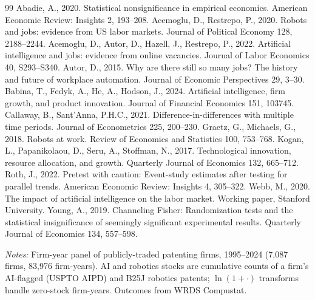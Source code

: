 \documentclass[12pt]{article}
\begin{document}
\begin{thebibliography}{99}
 Abadie, A., 2020. Statistical nonsignificance in empirical
economics. American Economic Review: Insights 2, 193--208.
 Acemoglu, D., Restrepo, P., 2020. Robots and
jobs: evidence from US labor markets. Journal of Political Economy 128, 2188--2244.
 Acemoglu, D., Autor, D., Hazell, J., Restrepo, P.,
2022. Artificial intelligence and jobs: evidence from online vacancies. Journal of Labor
Economics 40, S293--S340.
 Autor, D., 2015. Why are there still so many jobs? The history
and future of workplace automation. Journal of Economic Perspectives 29, 3--30.
 Babina, T., Fedyk, A., He, A., Hodson, J., 2024.
Artificial intelligence, firm growth, and product innovation. Journal of Financial Economics 151,
103745.
 Callaway, B., Sant'Anna, P.H.C., 2021.
Difference-in-differences with multiple time periods. Journal of Econometrics 225, 200--230.
 Graetz, G., Michaels, G., 2018. Robots at work.
Review of Economics and Statistics 100, 753--768.
 Kogan, L., Papanikolaou, D., Seru, A., Stoffman, N., 2017.
Technological innovation, resource allocation, and growth. Quarterly Journal of Economics 132,
665--712.
 Roth, J., 2022. Pretest with caution: Event-study estimates after
testing for parallel trends. American Economic Review: Insights 4, 305--322.
 Webb, M., 2020. The impact of artificial intelligence on the labor
market. Working paper, Stanford University.
 Young, A., 2019. Channeling Fisher: Randomization tests and the
statistical insignificance of seemingly significant experimental results. Quarterly Journal of
Economics 134, 557--598.
\end{thebibliography}

\FloatBarrier
\newpage
\begin{table}[htbp]\centering
\begin{threeparttable}
\caption{Summary statistics}\label{tab:sum}\small

\begin{tablenotes}\small\item \textit{Notes:} Firm-year panel of publicly-traded patenting firms,
1995--2024 (7{,}087 firms, 83{,}976 firm-years). AI and robotics stocks are cumulative counts of
a firm's AI-flagged (USPTO AIPD) and B25J robotics patents; $\ln(1+\cdot)$ transforms handle
zero-stock firm-years. Outcomes from WRDS Compustat.
\end{tablenotes}
\end{threeparttable}
\end{table}
\end{document}
